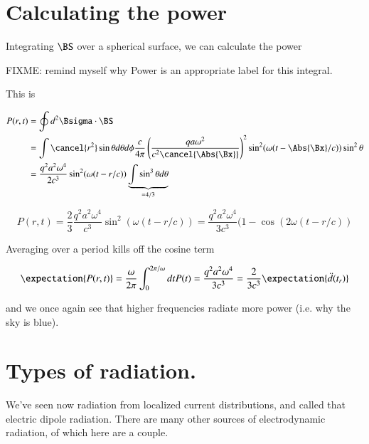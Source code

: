 \section{Calculating the power}

Integrating $\BS$ over a spherical surface, we can calculate the power

FIXME: remind myself why Power is an appropriate label for this integral.

This is

\begin{align*}
P(r, t)
&= \oint d^2 \Bsigma \cdot \BS \\
&= \int \cancel{r^2} \sin\theta d\theta d\phi 
\frac{c}{4 \pi}
\left( \frac{q a \omega^2}{c^2 \cancel{\Abs{\Bx}} } \right)^2
\sin^2(\omega (t - \Abs{\Bx}/c)) \sin^2\theta \\
&=
\frac{q^2 a^2 \omega^4}{2 c^3 }
\sin^2(\omega (t - r/c))
\underbrace{\int \sin^3\theta d\theta}_{=4/3}
\end{align*}

\begin{equation}\label{eqn:relativisticElectrodynamicsL21:220}
P(r, t) = \frac{2}{3} \frac{q^2 a^2 \omega^4}{c^3} \sin^2(\omega (t - r/c)) =
\frac{q^2 a^2 \omega^4}{3 c^3} (1 - \cos(2 \omega (t - r/c))
\end{equation}

Averaging over a period kills off the cosine term

\begin{equation}\label{eqn:relativisticElectrodynamicsL21:240}
\expectation{P(r, t)} = \frac{\omega}{2 \pi} \int_0^{2 \pi/\omega} dt P(t) = \frac{q^2 a^2 \omega^4}{3 c^3} = \frac{2}{3 c^3} \expectation{ \ddot{d}(t_r) }
\end{equation}

and we once again see that higher frequencies radiate more power (i.e. why the sky is blue).

\section{Types of radiation.}

We've seen now radiation from localized current distributions, and called that electric dipole radiation.  There are many other sources of electrodynamic radiation, of which here are a couple.

